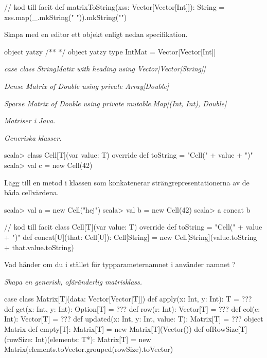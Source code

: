  
\begin{Code}
// kod till facit
def matrixToString(xss: Vector[Vector[Int]]): String = 
  xss.map(_.mkString(" ")).mkString("\n")
\end{Code}


\Subtask Skapa med en editor ett objekt enligt nedan specifikation. 

\begin{ScalaSpec}{object yatzy}
/** */
object yatzy {
  type IntMat = Vector[Vector[Int]]
}
\end{ScalaSpec}


\Task \emph{case class StringMatix with heading using Vector[Vector[String]]}


\Task \emph{Dense Matrix of Double using private Array[Double]}

\Task \emph{Sparse Matrix of Double using private mutable.Map[(Int, Int), Double]}




\Task \emph{Matriser i Java.}





\Task \emph{Generiska klasser.} 

\begin{REPL}
scala> class Cell[T](var value: T){
         override def toString = "Cell(" + value + ")"
       }
scala> val c = new Cell(42)
\end{REPL}

\Subtask Lägg till en metod  i klassen  som konkatenerar strängrepresentationerna av de båda cellvärdena.

\begin{REPL}
scala> val a = new Cell("hej")
scala> val b = new Cell(42)
scala> a concat b
\end{REPL}

\begin{Code}
// kod till facit
class Cell[T](var value: T){
  override def toString = "Cell(" + value + ")"
  def concat[U](that: Cell[U]): Cell[String] = 
    new Cell[String](value.toString + that.value.toString)
}
\end{Code}

\Subtask\Pen Vad händer om du i stället för typparameternamnet  i  använder namnet ?

\Task \emph{Skapa en generisk, ofäränderlig matrisklass.}

\begin{Code}
case class Matrix[T](data: Vector[Vector[T]]) {
  def apply(x: Int, y: Int): T = ???
  def get(x: Int, y: Int): Option[T] = ???
  def row(r: Int): Vector[T] = ???
  def col(c: Int): Vector[T] = ???
  def updated(x: Int, y: Int, value: T): Matrix[T] = ???
}
object Matrix {
  def empty[T]: Matrix[T] = new Matrix[T](Vector())
  def ofRowSize[T](rowSize: Int)(elements: T*): Matrix[T] =
    new Matrix(elements.toVector.grouped(rowSize).toVector)
}
\end{Code}

